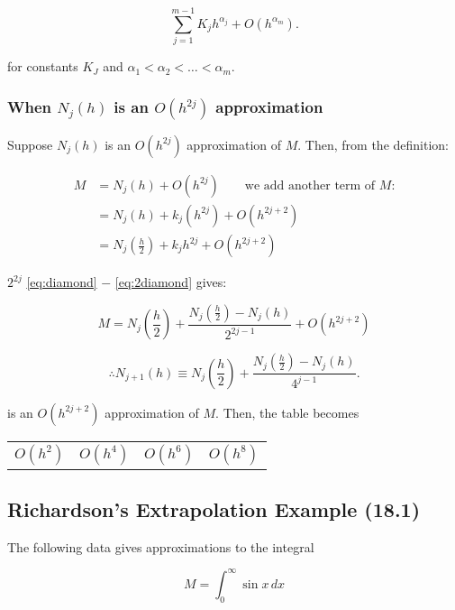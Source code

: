 \[
  \sum_{j=1}^{m-1} K_j h^{\alpha_j} + O(h^{\alpha_m})
.\]

\noindent
for constants $K_J$ and $\alpha_1 < \alpha_2 < \dots < \alpha_m$.

\subsubsection{When $N_j(h)$ is an $O(h^{2j})$ approximation}\label{sec:richardson_extrapolation_when_n_j_is_o_h_2j}
Suppose $N_j(h)$ is an $O(h^{2j})$ approximation of $M$. Then, from the
definition:

\begin{align}
  M &= N_j(h) + O(h^{2j}) \qquad \text{we add another term of } M \text{:} \\
    &= N_j(h) + k_j(h^{2j}) + O(h^{2j+2}) \label{eq:diamond} \\
    &= N_j(\frac{h}{2}) + k_jh^{2j} + O(h^{2j+2}) \label{eq:2diamond}
\end{align}

$2^{2j}$ \eqref{eq:diamond} $-$ \eqref{eq:2diamond} gives:

\begin{equation*}
  M = N_j(\frac{h}{2}) + \frac{N_j(\frac{h}{2})-N_j(h)}{2^{2j-1}} + O(h^{2j+2})
\end{equation*}

\[
  \boxed{\therefore 
    N_{j+1}(h) \equiv N_j\left(\frac{h}{2}\right) 
    + \frac{N_j\left(\frac{h}{2}\right)-N_j(h)}{4^{j-1}}
  }
.\]

\noindent
is an $O(h^{2j+2})$ approximation of $M$. Then, the table becomes

\begin{center}
  \centering
  \begin{tabular}{cccc}
    $O(h^2)$ & $O(h^4)$ & $O(h^6)$ & $O(h^8)$
  \end{tabular}
\end{center}

\subsection{Richardson's Extrapolation Example (18.1)}\label{sec:richardson_extrapolation_example}

\Ex The following data gives approximations to the integral 

\begin{equation}
  M = \int_0^\infty \sin x \, dx
\end{equation}


